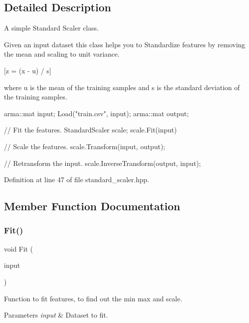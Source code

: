 \subsection{Detailed Description}
A simple Standard Scaler class. 

Given an input dataset this class helps you to Standardize features by removing the mean and scaling to unit variance.

[z = (x -\/ u) / s]

where u is the mean of the training samples and s is the standard deviation of the training samples.


\begin{DoxyCode}
arma::mat input;
Load(\textcolor{stringliteral}{"train.csv"}, input);
arma::mat output;

\textcolor{comment}{// Fit the features.}
StandardScaler scale;
scale.Fit(input)

\textcolor{comment}{// Scale the features.}
scale.Transform(input, output);

\textcolor{comment}{// Retransform the input.}
scale.InverseTransform(output, input);
\end{DoxyCode}
 

Definition at line 47 of file standard\+\_\+scaler.\+hpp.



\subsection{Member Function Documentation}
\mbox{\label{classmlpack_1_1data_1_1StandardScaler_a0b68c1a39a21e56e10f5b9250b056244}} 
\subsubsection{Fit()}
{\footnotesize\ttfamily void Fit (\begin{DoxyParamCaption}\item[{const Mat\+Type \&}]{input }\end{DoxyParamCaption})\hspace{0.3cm}{\ttfamily [inline]}}



Function to fit features, to find out the min max and scale. 


\begin{DoxyParams}{Parameters}
{\em input} & Dataset to fit. \\
\hline
\end{DoxyParams}


